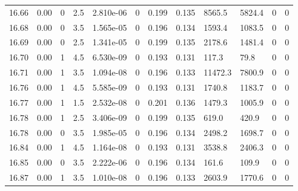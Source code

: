 \documentclass[preview]{standalone}
\begin{document}
{{{{{{{{{{{{{{{{{\begin{tabular}{L{1.2cm}C{1.2cm} C{0.3cm}C{0.5cm} C{1.4cm}C{1.4cm} C{1.4cm}C{1.4cm} C{1.6cm}C{1.6cm} C{1.6cm}C{1.6cm}}
  16.66  &  0.00  & 0     & 2.5 &  2.810e-06  & 0  &  0.199&   0.135& 8565.5 & 5824.4   &  0 & 0  \\ 
  16.68  &  0.00  & 0     & 3.5 &  1.565e-05  & 0  &  0.196&   0.134& 1593.4 & 1083.5   &  0 & 0  \\ 
  16.69  &  0.00  & 0     & 2.5 &  1.341e-05  & 0  &  0.199&   0.135& 2178.6 & 1481.4   &  0 & 0  \\ 
  16.70  &  0.00  & 1     & 4.5 &  6.530e-09  & 0  &  0.193&   0.131& 117.3 & 79.8   &  0 & 0  \\ 
  16.71  &  0.00  & 1     & 3.5 &  1.094e-08  & 0  &  0.196&   0.133& 11472.3 & 7800.9   &  0 & 0  \\ 
  16.76  &  0.00  & 1     & 4.5 &  5.585e-09  & 0  &  0.193&   0.131& 1740.8 & 1183.7   &  0 & 0  \\ 
  16.77  &  0.00  & 1     & 1.5 &  2.532e-08  & 0  &  0.201&   0.136& 1479.3 & 1005.9   &  0 & 0  \\ 
  16.78  &  0.00  & 1     & 2.5 &  3.406e-09  & 0  &  0.199&   0.135& 619.0 & 420.9   &  0 & 0  \\ 
  16.78  &  0.00  & 0     & 3.5 &  1.985e-05  & 0  &  0.196&   0.134& 2498.2 & 1698.7   &  0 & 0  \\ 
  16.84  &  0.00  & 1     & 4.5 &  1.164e-08  & 0  &  0.193&   0.131& 3538.8 & 2406.3   &  0 & 0  \\ 
  16.85  &  0.00  & 0     & 3.5 &  2.222e-06  & 0  &  0.196&   0.134& 161.6 & 109.9   &  0 & 0  \\ 
  16.87  &  0.00  & 1     & 3.5 &  1.010e-08  & 0  &  0.196&   0.133& 2603.9 & 1770.6   &  0 & 0  \\ 
\hline 
\end{tabular} 

}}}}}}}}}}}}}}}}}
\end{document}

